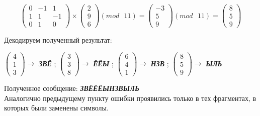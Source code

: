 \documentclass[a5paper, 10pt]{article}
\theoremstyle{definition}
\theoremstyle{plain}
\theoremstyle{remark}
\begin{document}
\begin{equation}
\begin{pmatrix}
 0 & -1 & 1 \\
1 & 1 & -1\\
0 & 1 & 0
\end{pmatrix}
 \times
\begin{pmatrix}
2\\
9\\
6
\end{pmatrix}
(mod \text{ }11)
= 
\begin{pmatrix}
-3\\
5\\
9
\end{pmatrix}
(mod \text{ }11)
= \begin{pmatrix}
8 \\
5\\
9
\end{pmatrix}
\end{equation}

Декодируем полученный результат:
\begin{center}
 $ \begin{pmatrix}
4 \\
1\\
3
\end{pmatrix} \to$ \textbf{\textit{ЗВЁ}} ;
 $ \begin{pmatrix}
3 \\
3\\
8
\end{pmatrix} \to$ \textbf{\textit{ЁЁЫ}} ;
 $ \begin{pmatrix}
6 \\
4\\
1
\end{pmatrix} \to$ \textbf{\textit{НЗВ}} ;
 $ \begin{pmatrix}
8 \\
5\\
9
\end{pmatrix} \to$ \textbf{\textit{ЫЛЬ}}  \\

\end{center}
Полученное сообщение:  \textbf{\textit{\colorbox{green! 50}{ЗВЁ}\colorbox{red! 50}{ЁЁЫ}\colorbox{red! 50}{НЗВ}\colorbox{green! 50}{ЫЛЬ}}}\\
Аналогично предыдущему пункту ошибки проявились только в тех фрагментах, в которых были заменены символы.\\
\end{document}

